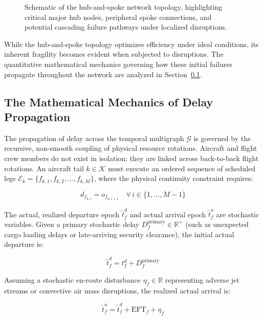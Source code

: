 \documentclass[11pt,a4paper]{book}
\begin{document}
\begin{figure}[h]
\centering
\caption{Schematic of the hub-and-spoke network topology, highlighting critical major hub nodes, peripheral spoke connections, and potential cascading failure pathways under localized disruptions.}
\label{fig:hub_spoke}
\end{figure}

While the hub-and-spoke topology optimizes efficiency under ideal conditions, its inherent fragility becomes evident when subjected to disruptions. The quantitative mathematical mechanics governing how these initial failures propagate throughout the network are analyzed in Section~\ref{sec:delay_propagation}.

\subsection{The Mathematical Mechanics of Delay Propagation}\label{sec:delay_propagation}

The propagation of delay across the temporal multigraph $\mathcal{G}$ is governed by the recursive, non-smooth coupling of physical resource rotations. Aircraft and flight crew members do not exist in isolation; they are linked across back-to-back flight rotations. An aircraft tail $k \in \mathcal{K}$ must execute an ordered sequence of scheduled legs $\mathcal{E}_k = \{f_{k, 1}, f_{k, 2}, \dots, f_{k, M}\}$, where the physical continuity constraint requires:

\begin{equation}
d_{f_{k, i}} = o_{f_{k, i+1}} \quad \forall \, i \in \{1, \dots, M-1\}
\end{equation}

The actual, realized departure epoch $\tilde{t}_f^d$ and actual arrival epoch $\tilde{t}_f^a$ are stochastic variables. Given a primary stochastic delay $D_f^{\text{primary}} \in \mathbb{R}^+$ (such as unexpected cargo loading delays or late-arriving security clearance), the initial actual departure is:

\begin{equation}
\tilde{t}_{f}^d = t_{f}^d + D_f^{\text{primary}}
\end{equation}

Assuming a stochastic en-route disturbance $\eta_f \in \mathbb{R}$ representing adverse jet streams or convective air mass disruptions, the realized actual arrival is:

\begin{equation}
\tilde{t}_{f}^a = \tilde{t}_{f}^d + \text{EFT}_f + \eta_f
\end{equation}
\end{document}
